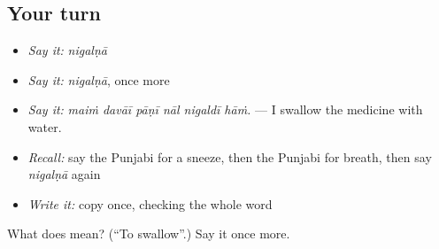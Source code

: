 \subsection*{Your turn}
\begin{itemize}
\raggedright
  \item \emph{Say it:} \emph{nigalṇā}
  \item \emph{Say it:} \emph{nigalṇā}, once more
  \item \emph{Say it:} \emph{maiṁ davāī pāṇī nāl nigaldī hāṁ.} — I swallow the medicine with water.
  \item \emph{Recall:} say the Punjabi for a sneeze, then the Punjabi for breath, then say \emph{nigalṇā} again
  \item \emph{Write it:} copy \textbf{} once, checking the whole word
\end{itemize}

\begin{tcolorbox}[breakable,colback=teal!4,colframe=teal!35!black,title={Before you move on}]
What does  mean? (\textquotedblleft{}To swallow\textquotedblright{}.) Say it once more.
\end{tcolorbox}
